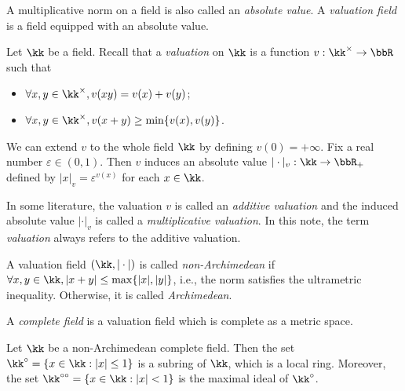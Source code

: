     \begin{definition}\label{def:valuation_field}
        A multiplicative norm on a field is also called an \emph{absolute value}.
        A \emph{valuation field} is a field equipped with an absolute value.
    \end{definition}

    \begin{remark}\label{rmk:additive_and_multiplicative_valuation_on_a_field}
        Let \(\kk\) be a field.
        Recall that a \emph{valuation} on \(\kk\) is a function \(v: \kk^\times \to \bbR\) such that
        \begin{itemize}
            \item \(\forall x,y \in \kk^\times, v(xy) = v(x) + v(y)\);
            \item \(\forall x,y \in \kk^\times, v(x + y) \geq \min\{v(x), v(y)\}\).
        \end{itemize}
        We can extend \(v\) to the whole field \(\kk\) by defining \(v(0) = +\infty\).
        Fix a real number \(\varepsilon \in (0,1)\).
        Then \(v\) induces an absolute value \(|\cdot|_v: \kk \to \bbR_+\) defined by \(|x|_v = \varepsilon^{v(x)}\) for each \(x \in \kk\).

        In some literature, the valuation \(v\) is called an \emph{additive valuation} and the induced absolute value \(|\cdot|_v\) is called a \emph{multiplicative valuation}.
        In this note, the term \emph{valuation} always refers to the additive valuation.
    \end{remark}

    \begin{definition}\label{def:non-archimedean_valuation}
        A valuation field \((\kk, |\cdot|)\) is called \emph{non-Archimedean} if \(\forall x,y \in \kk, |x + y| \leq \max\{|x|, |y|\}\), i.e., the norm satisfies the ultrametric inequality.
        Otherwise, it is called \emph{Archimedean}.
    \end{definition}
    
    \begin{definition}\label{def:complete_field}
        A \emph{complete field} is a valuation field which is complete as a metric space.
    \end{definition}

    \begin{lemma}\label{lem:ring_of_integers_of_non-archimedean_field}
        Let \(\kk\) be a non-Archimedean complete field.
        Then the set \(\kk^\circ = \{x \in \kk : |x| \leq 1\}\) is a subring of \(\kk\), which is a local ring.
        Moreover, the set \(\kk^{\circ\circ} = \{x \in \kk : |x| < 1\}\) is the maximal ideal of \(\kk^\circ\).
    \end{lemma}

